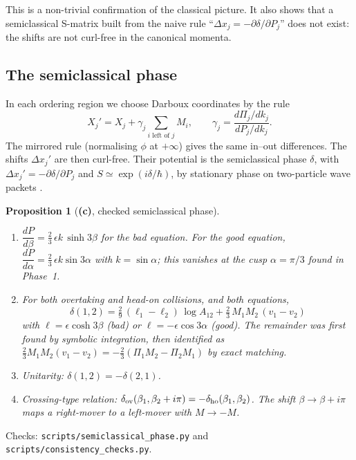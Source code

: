 \documentclass[11pt,a4paper]{article}
\newcommand{\Lc}{\textsf{\textbf{(c)}}\xspace}
\newcommand{\script}[1]{\texttt{scripts/#1}}
\newtheorem{proposition}{Proposition}[section]
\theoremstyle{remark}\newtheorem{remark}[proposition]{Remark}
\begin{document}
This is a non-trivial confirmation of the classical picture. It also shows that a semiclassical S-matrix built from the naive rule ``$\Delta x_j=-\partial\delta/\partial P_j$'' does not exist: the shifts are not curl-free in the canonical momenta.

\subsection{The semiclassical phase}

In each ordering region we choose Darboux coordinates by the rule
\[
X_j'=X_j+\gamma_j\sum_{i\text{ left of }j}M_i,\qquad \gamma_j=\frac{d\Pi_j/dk_j}{dP_j/dk_j}.
\]
The mirrored rule (normalising $\phi$ at $+\infty$) gives the same in--out differences. The shifts $\Delta x_j'$ are then curl-free. Their potential is the semiclassical phase $\delta$, with $\Delta x_j'=-\partial\delta/\partial P_j$ and $S\simeq\exp(i\delta/\hbar)$, by stationary phase on two-particle wave packets \cite{FK}.

\begin{proposition}[\Lc, checked semiclassical phase]\label{prop:delta}
\begin{enumerate}
\item $\dfrac{dP}{d\beta}=\tfrac23\,\epsilon k\,\sinh3\beta$ for the bad equation. For the good equation, $\dfrac{dP}{d\alpha}=\tfrac23\,\epsilon k\sin3\alpha$ with $k=\sin\alpha$; this vanishes at the cusp $\alpha=\pi/3$ found in Phase~1.
\item For both overtaking and head-on collisions, and both equations,
\begin{equation}\label{eq:delta}
\boxed{\ \delta(1,2)=\tfrac29\,(\ell_1-\ell_2)\,\log A_{12}+\tfrac23\,M_1M_2\,(v_1-v_2)\ }
\end{equation}
with $\ell=\epsilon\cosh3\beta$ (bad) or $\ell=-\epsilon\cos3\alpha$ (good). The remainder was first found by symbolic integration, then identified as $\tfrac23M_1M_2(v_1-v_2)=-\tfrac23(\Pi_1M_2-\Pi_2M_1)$ by exact matching.
\item \emph{Unitarity:} $\delta(1,2)=-\delta(2,1)$.
\item \emph{Crossing-type relation:} $\delta_{\rm ov}(\beta_1,\beta_2+i\pi)=-\delta_{\rm ho}(\beta_1,\beta_2)$. The shift $\beta\to\beta+i\pi$ maps a right-mover to a left-mover with $M\to-M$.
\end{enumerate}
\end{proposition}
Checks: \script{semiclassical\_\allowbreak phase.py} and \script{consistency\_\allowbreak checks.py}.
\end{document}
